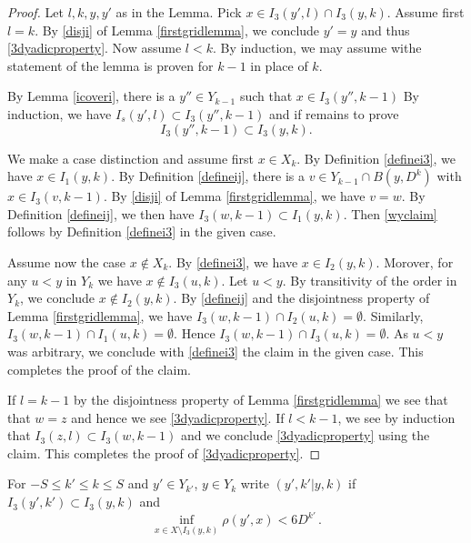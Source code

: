 \begin{proof}
Let $l,k,y,y'$ as in the Lemma.
Pick $x\in I_3(y',l)\cap I_3(y,k)$.
Assume first $l=k$. By \eqref{disji} of Lemma
\ref{firstgridlemma}, we conclude $y'=y$
and thus \eqref{3dyadicproperty}.
Now assume $l<k$. By induction, we may assume
 withe statement of the lemma is proven for $k-1$ in place of $k$.

By Lemma \ref{icoveri}, there is
a $y''\in Y_{k-1}$ such that $x\in I_3(y'',k-1)$
By induction, we have $I_s(y',l)\subset I_3(y'',k-1)$
and if remains to prove
\begin{equation}\label{wyclaim}
I_3(y'',k-1)\subset I_3(y,k).
\end{equation}

We make a case distinction and assume first $x\in X_k$.
By Definition \eqref{definei3}, we have
 $x\in I_1(y,k)$. By Definition \eqref{defineij}, there is a $v\in Y_{k-1}\cap B(y,D^k)$ with $x\in I_3(v,k-1)$.
By \eqref{disji} of Lemma \ref{firstgridlemma}, we have $v=w$.
By Definition \eqref{defineij}, we then have
$I_3(w,k-1)\subset I_1(y,k)$.
Then \eqref{wyclaim} follows by Definition \eqref{definei3} in the given case.

Assume now the case $x\notin X_k$.
By \eqref{definei3}, we have
 $x\in I_2(y,k)$. Morover, for any $u<y$ in
 $Y_k$ we have $x\not\in I_3(u,k)$.
 Let $u<y$. By transitivity of the order in $Y_k$, we conclude $x\not \in I_2(y,k)$.
By \eqref{defineij} and the disjointness property of Lemma \ref{firstgridlemma}, we have
$I_3(w,k-1)\cap  I_2(u,k)= \emptyset$.
Similarly, $I_3(w,k-1)\cap  I_1(u,k)= \emptyset$.
Hence $I_3(w,k-1)\cap  I_3(u,k)=\emptyset$.
As $u<y$ was arbitrary, we conclude with
\eqref{definei3} the claim in the given case.
This completes the proof of the claim.

If $l=k-1$ by the disjointness property
of Lemma \ref{firstgridlemma} we see that
that $w=z$ and hence we see \eqref{3dyadicproperty}.
If $l<k-1$, we see by induction that
$I_3(z,l)\subset I_3(w,k-1)$ and we conclude
\eqref{3dyadicproperty} using the claim.
This completes the proof of \eqref{3dyadicproperty}.
\end{proof}




For $-S\le k'\le k\le S$ and $y'\in Y_{k'}$, $y\in Y_k$
write  $(y',k'|y,k)$ if $I_3(y',k')\subset I_3(y,k)$ and
\begin{equation}\label{bdcond}
    \inf_{x\in X\setminus I_3(y,k)}\rho(y',x)<6D^{k'}\, .
\end{equation}


